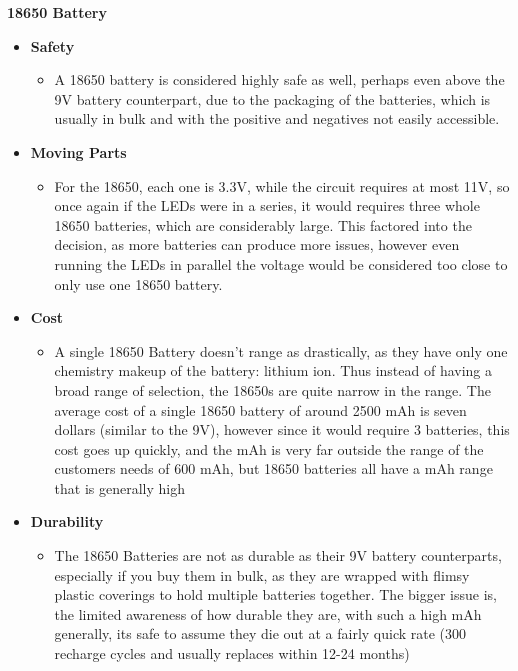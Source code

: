 \documentclass[12pt]{article}
\begin{document}
				\noindent\textbf{18650 Battery}
				{\renewcommand\labelitemi{}
					\begin{itemize}
						\item \textbf{Safety}
						\begin{itemize}
							\item A 18650 battery is considered highly safe as well, perhaps even above the 9V battery counterpart, due to the packaging of the batteries, which is usually in bulk and with the positive and negatives not easily accessible. 
						\end{itemize}
						\item \textbf{Moving Parts}
						\begin{itemize}
							\item For the 18650, each one is 3.3V, while the circuit requires at most 11V, so once again if the LEDs were in a series, it would requires three whole 18650 batteries, which are considerably large. This factored into the decision, as more batteries can produce more issues, however even running the LEDs in parallel the voltage would be considered too close to only use one 18650 battery.
						\end{itemize}
						\item \textbf{Cost}
						\begin{itemize}
							\item A single 18650 Battery doesn't range as drastically, as they have only one chemistry makeup of the battery: lithium ion. Thus instead of having a broad range of selection, the 18650s are quite narrow in the range. The average cost of a single 18650 battery of around 2500 mAh is seven dollars (similar to the 9V), however since it would require 3 batteries, this cost goes up quickly, and the mAh is very far outside the range of the customers needs of 600 mAh, but 18650 batteries all have a mAh range that is generally high
						\end{itemize}
						\item \textbf{Durability}
						\begin{itemize}
							\item The 18650 Batteries are not as durable as their 9V battery counterparts, especially if you buy them in bulk, as they are wrapped with flimsy plastic coverings to hold multiple batteries together. The bigger issue is, the limited awareness of how durable they are, with such a high mAh generally, its safe to assume they die out at a fairly quick rate (300 recharge cycles and usually replaces within 12-24 months)

\end{itemize}
\end{itemize}}
\end{document}
